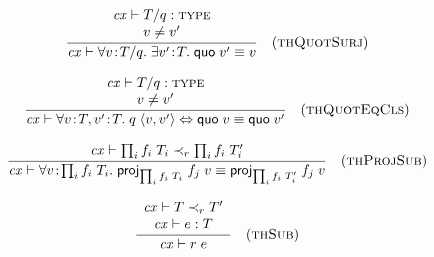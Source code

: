 \[
\frac{\begin{array}{c}\mathit{cx}\vdash T/q:\textsc{type}\\v\neq v'\end{array}}{\mathit{cx}\vdash\forall v\!:\!T/q.\;\exists v'\!:\!T.\;\mathsf{quo}\;v'\equiv v}\quad\mbox{(\textsc{thQuotSurj})}
\]

\[
\frac{\begin{array}{c}\mathit{cx}\vdash T/q:\textsc{type}\\v\neq v'\end{array}}{\mathit{cx}\vdash\forall v\!:\!T,v'\!:\!T.\;q\;\langle v,v'\rangle\Leftrightarrow\mathsf{quo}\;v\equiv\mathsf{quo}\;v'}\quad\mbox{(\textsc{thQuotEqCls})}
\]

\[
\frac{\begin{array}{c}\mathit{cx}\vdash\prod_{i}f_i\;T_i\prec_{r}\prod_{i}f_i\;T_i'\end{array}}{\mathit{cx}\vdash\forall v\!:\!\prod_{i}f_i\;T_i.\;\mathsf{proj}_{\prod_{i}f_i\;T_i}\;{f_j}\;v\equiv\mathsf{proj}_{\prod_{i}f_i\;T_i'}\;{f_j}\;v}\quad\mbox{(\textsc{thProjSub})}
\]


\[
\frac{\begin{array}{c}\mathit{cx}\vdash T\prec_{r}T'\\\mathit{cx}\vdash e:T\end{array}}{\mathit{cx}\vdash r\;e}\quad\mbox{(\textsc{thSub})}
\]

